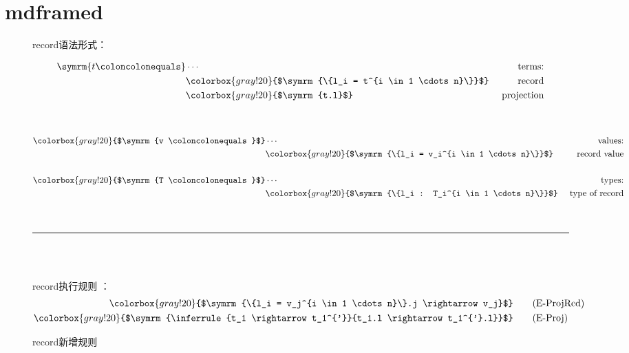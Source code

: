 \documentclass[math,logic,quote,code,mode=simple]{codedumpnote}
\begin{document}
\section{mdframed}
\begin{figure}[H]
\caption{\textup{record}新增规则}
\textup{record}语法形式：
\begin{mdframed}[leftline=false,rightline=false,align=center]
\begin{minipage}[t]{0.5\textwidth}
\begin{flushleft}
\begin{align*}
	\symrm{t \coloncolonequals} & \cdots \ &\textup{terms:}\\
	&\colorbox{gray!20}{$\symrm{\{l_i = t^{i \in 1 \cdots n}\}}$} \ &\textup{record} \\
	&\colorbox{gray!20}{$\symrm{t.l}$} \ &\textup{projection} \\
\end{align*}
\end{flushleft}
\end{minipage}
\ \ \vline \ \
\begin{minipage}[t]{0.5\textwidth}
\begin{flushleft}
\begin{align*}
	\colorbox{gray!20}{$\symrm{v \coloncolonequals}$} & \cdots \ &\textup{values:}\\
	&\colorbox{gray!20}{$\symrm{\{l_i = v_i^{i \in 1 \cdots n}\}}$} \ &\textup{record value} \\
	\\
	\colorbox{gray!20}{$\symrm{T \coloncolonequals}$} & \cdots \ &\textup{types:}\\
	&\colorbox{gray!20}{$\symrm{\{l_i : T_i^{i \in 1 \cdots n}\}}$} \ &\textup{type of record} \\	
\end{align*}
\end{flushleft}
\end{minipage}
\ \\
\hrule
\ \\
\ \\
\begin{minipage}[t]{0.5\textwidth}
\begin{flushleft}
\textup{record}执行规则 ：
\begin{align*}
    \colorbox{gray!20}{$\symrm{\{l_i = v_j^{i \in 1 \cdots n}\}.j \rightarrow v_j}$} & \tag{E-ProjRcd} \\
	\colorbox{gray!20}{$\symrm{\inferrule{t_1 \rightarrow t_1^{'}}{t_1.l \rightarrow t_1^{'}.l}}$} & \tag{E-Proj} \\

\end{align*}
\end{flushleft}
\end{minipage}
\end{mdframed}
\end{figure}
\end{document}
